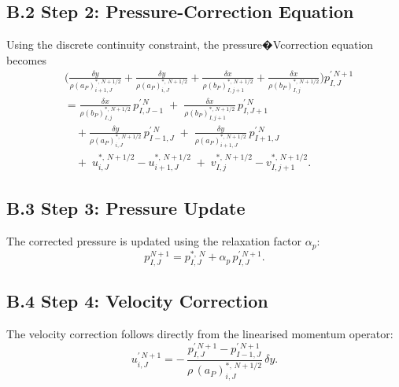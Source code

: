 \documentclass[12pt]{article}
\theoremstyle{plain}  %
\theoremstyle{definition}  %
\begin{document}
\subsection*{B.2 \quad Step 2: Pressure-Correction Equation}

Using the discrete continuity constraint, the pressure�Vcorrection equation becomes
\begin{equation}
\begin{aligned}
&\Bigg(
\frac{\delta y}{\rho(a_P)_{i+1,J}^{*,\,N+1/2}}
+ \frac{\delta y}{\rho(a_P)_{i,J}^{*,\,N+1/2}}
+ \frac{\delta x}{\rho(b_P)_{I,j+1}^{*,\,N+1/2}}
+ \frac{\delta x}{\rho(b_P)_{I,j}^{*,\,N+1/2}}
\Bigg)
p_{I,J}^{\prime\,N+1}
\\[4pt]
&= 
\frac{\delta x}{\rho(b_P)_{I,j}^{*,\,N+1/2}}\, p_{I,J-1}^{\prime\,N}
\;+\;
\frac{\delta x}{\rho(b_P)_{I,j+1}^{*,\,N+1/2}}\, p_{I,J+1}^{\prime\,N}
\\
&\quad
+\frac{\delta y}{\rho(a_P)_{i,J}^{*,\,N+1/2}} \, p_{I-1,J}^{\prime\,N}
\;+\;
\frac{\delta y}{\rho(a_P)_{i+1,J}^{*,\,N+1/2}} \, p_{I+1,J}^{\prime\,N}
\\
&\quad
+\;u_{i,J}^{*,\,N+1/2} - u_{i+1,J}^{*,\,N+1/2}
\;+\;
v_{I,j}^{*,\,N+1/2} - v_{I,j+1}^{*,\,N+1/2}.
\end{aligned}
\label{eq:eq2}
\end{equation}

\subsection*{B.3 \quad Step 3: Pressure Update}

The corrected pressure is updated using the relaxation factor $\alpha_p$:
\begin{equation}
p_{I,J}^{N+1}
= p_{I,J}^{*,\,N}
+ \alpha_p\, p_{I,J}^{\prime\,N+1}.
\label{eq:eq3}
\end{equation}

\subsection*{B.4 \quad Step 4: Velocity Correction}

The velocity correction follows directly from the linearised momentum operator:
\begin{equation}
u_{i,J}^{\prime\,N+1}
= -\,\frac{ p_{I,J}^{\prime\,N+1} - p_{I-1,J}^{\prime\,N+1} }
       {\rho\, (a_P)_{i,J}^{*,\,N+1/2}}\,
  \delta y.
\label{eq:eq4}
\end{equation}
\end{document}

